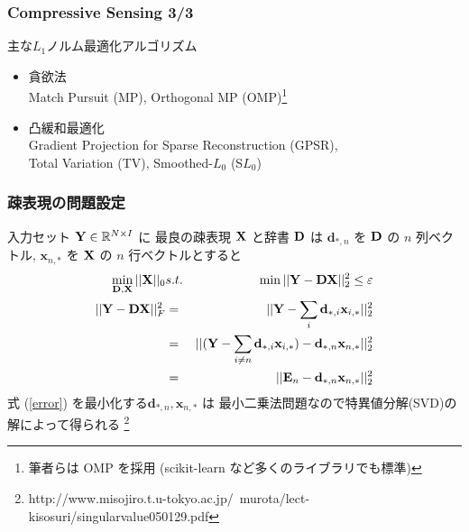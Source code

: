 \begin{frame}\frametitle{Compressive Sensing 3/3}
\begin{block}{主な$L_1$ノルム最適化アルゴリズム}
\begin{itemize}
    \item 貪欲法\\
        Match Pursuit (MP),
        Orthogonal MP (OMP)\footnote{筆者らは OMP を採用 (scikit-learn など多くのライブラリでも標準)}

    \item 凸緩和最適化\\
        Gradient Projection for Sparse Reconstruction (GPSR),\\
        Total Variation (TV),
        Smoothed-$L_0$ (S$L_0$)
\end{itemize}
\end{block}
\end{frame}




\begin{frame}\frametitle{疎表現の問題設定}
\label{ksvd}
入力セット ${\mathbf{Y}} \in {\mathbb{R}^{N\times I}}$ に
最良の疎表現 ${\mathbf{X}}$ と辞書 ${\mathbf{D}}$ は
$\mathbf{d}_{*,n}$ を ${\mathbf{D}}$ の $n$ 列ベクトル,
$\mathbf{x}_{n,*}$ を ${\mathbf{X}}$ の $n$ 行ベクトルとすると
\begin{eqnarray}
    \min_{{\mathbf{D}}, {\mathbf{X}}} ||{\mathbf{X}}||_0
    &s.t.& \min ||{\mathbf{Y}}-{\mathbf{D}}{\mathbf{X}}||^2_2 \leq \varepsilon \\
    ||{\mathbf{Y}}-{\mathbf{D}}{\mathbf{X}}||^2_F &=&
    ||{\mathbf{Y}} - \sum_{i} \mathbf{d}_{*,i} \mathbf{x}_{i,*}||^2_2 \\
    &=& ||({\mathbf{Y}} - \sum_{i \neq n} \mathbf{d}_{*,i} \mathbf{x}_{i,*}) - \mathbf{d}_{*,n} \mathbf{x}_{n,*}||^2_2 \\
    &=& ||\mathbf{E}_n - \mathbf{d}_{*,n} \mathbf{x}_{n,*}||^2_2 \label{error}
\end{eqnarray}
式 (\ref{error}) を最小化する$\mathbf{d}_{*,n}, \mathbf{x}_{n,*}$ は
最小二乗法問題なので特異値分解(SVD)の解によって得られる
\footnote{http://www.misojiro.t.u-tokyo.ac.jp/~murota/lect-kisosuri/singularvalue050129.pdf}
\end{frame}


